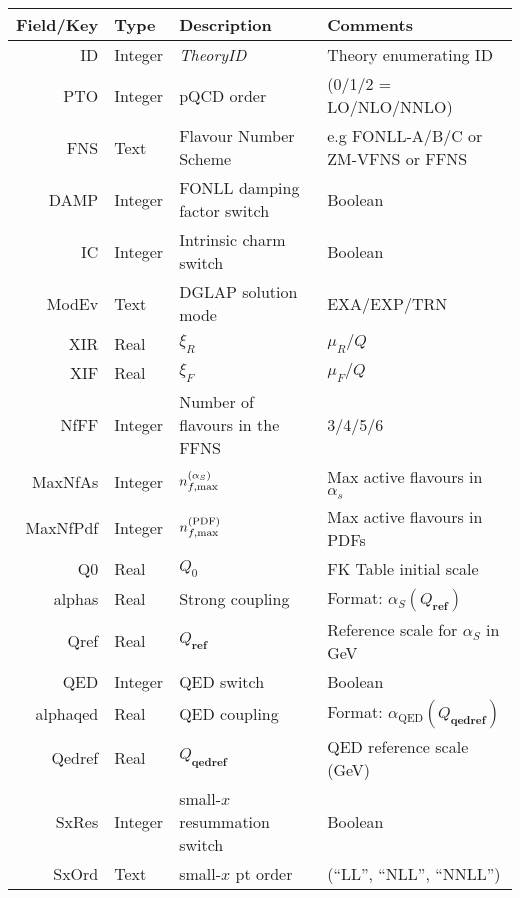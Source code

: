 \documentclass[11pt]{article}
\begin{document}
\begin{table}[htp]
\begin{center}
\begin{tabular}{|r|l|l|p{50mm}|}
\hline
Field/Key       & Type    & Description                    & Comments \\
\hline\hline
  ID        & Integer & \it TheoryID                   &  Theory enumerating ID \\
  PTO       & Integer & pQCD order                     & (0/1/2 = LO/NLO/NNLO) \\
  FNS       & Text    & Flavour Number Scheme          & e.g FONLL-A/B/C \newline or ZM-VFNS or FFNS \\
  DAMP      & Integer & FONLL damping factor switch    & Boolean \\
  IC        & Integer & Intrinsic charm switch         & Boolean \\
  ModEv     & Text    & DGLAP solution mode            & EXA/EXP/TRN \\
  XIR       & Real    & $\xi_R$                        & $\mu_R/Q$ \\
  XIF       & Real    & $\xi_F$                        & $\mu_F/Q$ \\
  NfFF      & Integer & Number of flavours in the FFNS & 3/4/5/6 \\
  MaxNfAs   & Integer & $n_{f,\rm max}^{(\alpha_S)}$        & Max active flavours in $\alpha_s$ \\
  MaxNfPdf  & Integer & $n_{f,\rm max}^{(\rm PDF)}$         & Max active flavours in PDFs \\
  Q0        & Real    & $Q_0$                          & FK Table initial scale \\
  alphas    & Real    & Strong coupling                & Format: $\alpha_S(Q_{\textbf{ref}})$ \\
  Qref      & Real    & $Q_{\textbf{ref}}$                & Reference scale for $\alpha_S$ in GeV \\
  QED       & Integer & QED switch                     & Boolean \\
  alphaqed  & Real    & QED coupling                   & Format: $\alpha_{\mathrm{QED}}(Q_{\textbf{qedref}})$ \\
  Qedref    & Real    & $Q_{\textbf{qedref}}$              & QED reference scale (GeV) \\
  SxRes     & Integer & small-$x$ resummation switch   & Boolean \\
  SxOrd     & Text    & small-$x$ pt order             & (``LL'', ``NLL'', ``NNLL'') \\

\end{tabular}
\end{center}
\end{table}
\end{document}
